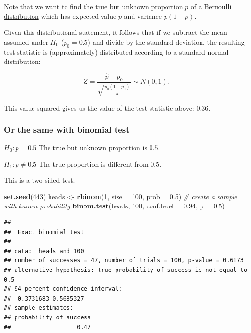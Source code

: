 \documentclass[
]{book}
\newenvironment{Shaded}{\begin{snugshade}}{\end{snugshade}}
\newcommand{\AttributeTok}[1]{\textcolor[rgb]{0.13,0.29,0.53}{#1}}
\newcommand{\CommentTok}[1]{\textcolor[rgb]{0.56,0.35,0.01}{\textit{#1}}}
\newcommand{\DecValTok}[1]{\textcolor[rgb]{0.00,0.00,0.81}{#1}}
\newcommand{\FloatTok}[1]{\textcolor[rgb]{0.00,0.00,0.81}{#1}}
\newcommand{\FunctionTok}[1]{\textcolor[rgb]{0.13,0.29,0.53}{\textbf{#1}}}
\newcommand{\NormalTok}[1]{#1}
\newcommand{\OtherTok}[1]{\textcolor[rgb]{0.56,0.35,0.01}{#1}}
\begin{document}
Note that we want to find the true but unknown proportion \(p\) of a
\href{https://en.wikipedia.org/wiki/Bernoulli_distribution}{Bernoulli distribution} which has expected value \(p\) and variance \(p(1-p)\).

Given this distributional statement, it follows that if we subtract the mean assumed under \(H_0\) (\(p_0 = 0.5\)) and divide by the standard deviation,
the resulting test statistic is (approximately) distributed according to a standard normal distribution:

\[Z = \frac{\hat{p} - p_0}{\sqrt{\frac{p_0(1-p_0)}{n}}} \sim N(0, 1).\]

This value squared gives us the value of the test statistic above: \(0.36\).

\subsubsection{Or the same with binomial test}\label{or-the-same-with-binomial-test}

\(H_0: p = 0.5\) The true but unknown proportion is \(0.5\).

\(H_1: p \ne 0.5\) The true proportion is different from \(0.5\).

This is a two-sided test.

\begin{Shaded}
\begin{Highlighting}[]
\FunctionTok{set.seed}\NormalTok{(}\DecValTok{443}\NormalTok{)}
\NormalTok{heads }\OtherTok{\textless{}{-}} \FunctionTok{rbinom}\NormalTok{(}\DecValTok{1}\NormalTok{, }\AttributeTok{size =} \DecValTok{100}\NormalTok{,}
                \AttributeTok{prob =} \FloatTok{0.5}\NormalTok{) }\CommentTok{\# create a sample with known probability}
\FunctionTok{binom.test}\NormalTok{(heads, }\DecValTok{100}\NormalTok{,}
           \AttributeTok{conf.level =} \FloatTok{0.94}\NormalTok{, }\AttributeTok{p =} \FloatTok{0.5}\NormalTok{)}
\end{Highlighting}
\end{Shaded}

\begin{verbatim}
## 
##  Exact binomial test
## 
## data:  heads and 100
## number of successes = 47, number of trials = 100, p-value = 0.6173
## alternative hypothesis: true probability of success is not equal to 0.5
## 94 percent confidence interval:
##  0.3731683 0.5685327
## sample estimates:
## probability of success 
##                   0.47
\end{verbatim}
\end{document}
